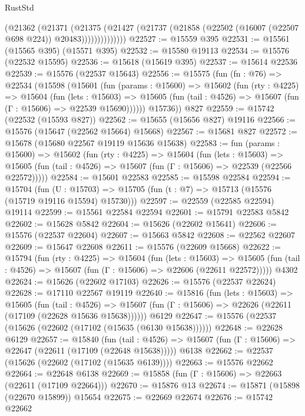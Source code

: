 \begin{lexlean}{RustStd}
\begin{coremodule}
                  (@21362
                    (@21371
                      (@21375
                        (@21427
                          (@21737 (@21858 (@22502 (@16007 (@22507 @698 @224)) @20483))))))))))))))
@22527 := @15559 @395
@22531 := @15561 (@15565 @395) (@15571 @395)
@22532 := @15580 @19113
@22534 := @15576 (@22532 @15595)
@22536 := @15618 (@15619 @395)
@22537 := @15614 @22536
@22539 := @15576 (@22537 @15643)
@22556 := @15575
    (fun (fn : @76) =>
    @22534
      (@15598
        (@15601
          (fun (params : @15600) =>
          @15602
            (fun (rty : @4225) =>
            @15604
              (fun (lets : @15603) =>
              @15605 (fun (tail : @4526) => @15607 (fun (Γ : @15606) => @22539 @15690))))))
        @15736))
    @827
@22559 := @15742 (@22532 (@15593 @827))
@22562 := @15655 (@15656 @827) @19116
@22566 := @15576 (@15647 (@22562 @15664) @15668)
@22567 := @15681 @827
@22572 := @15678 (@15680 @22567 @19119 @15636 @15638)
@22583 := fun (params : @15600) =>
  @15602
    (fun (rty : @4225) =>
    @15604
      (fun (lets : @15603) =>
      @15605 (fun (tail : @4526) => @15607 (fun (Γ : @15606) => @22539 (@22566 @22572)))))
@22584 := @15601 @22583
@22585 := @15598 @22584
@22594 := @15704
    (fun (U : @15703) => @15705 (fun (t : @7) => @15713 (@15576 (@15719 @19116 @15594) @15730)))
@22597 := @22559 (@22585 @22594) @19114
@22599 := @15561 @22584 @22594
@22601 := @15791 @22583 @5842
@22602 := @15628 @5842
@22604 := @15626 (@22602 @15641)
@22606 := @15576 (@22537 @22604)
@22607 := @15663 @5842
@22608 := @22562 @22607
@22609 := @15647 @22608
@22611 := @15576 (@22609 @15668)
@22622 := @15794
    (fun (rty : @4225) =>
    @15604
      (fun (lets : @15603) =>
      @15605 (fun (tail : @4526) => @15607 (fun (Γ : @15606) => @22606 (@22611 @22572)))))
    @4302
@22624 := @15626 (@22602 @17103)
@22626 := @15576 (@22537 @22624)
@22628 := @17110 @22567 @19119
@22640 := @15816
    (fun (lets : @15603) =>
    @15605
      (fun (tail : @4526) =>
      @15607 (fun (Γ : @15606) => @22626 (@22611 (@17109 (@22628 @15636 @15638))))))
    @6129
@22647 := @15576 (@22537 (@15626 (@22602 (@17102 (@15635 (@6130 @15638))))))
@22648 := @22628 @6129
@22657 := @15840
    (fun (tail : @4526) => @15607 (fun (Γ : @15606) => @22647 (@22611 (@17109 (@22648 @15638)))))
    @6138
@22662 := @22537 (@15626 (@22602 (@17102 (@15635 @6139))))
@22663 := @15576 @22662
@22664 := @22648 @6138
@22669 := @15858 (fun (Γ : @15606) => @22663 (@22611 (@17109 @22664)))
@22670 := @15876 @13
@22674 := @15871 (@15898 (@22670 @15899)) @15654
@22675 := @22669 @22674
@22676 := @15742 @22662

\end{coremodule}
\end{lexlean}
